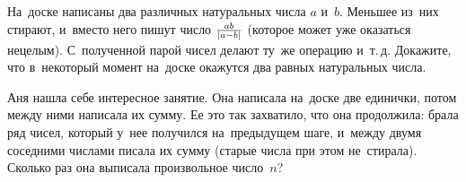 \begin{problems}
\item
На~доске написаны два различных натуральных числа $a$ и~$b$.
Меньшее из~них стирают, и~вместо него пишут число $\frac{ab}{\lvert a - b \rvert}$
(которое может уже оказаться нецелым).
С~полученной парой чисел делают ту~же операцию и~т.\,д.
Докажите, что в~некоторый момент на~доске окажутся два равных натуральных
числа.

\item
Аня нашла себе интересное занятие.
Она написала на~доске две единички, потом между ними написала их сумму.
Ее это так захватило, что она продолжила: брала ряд чисел, который у~нее
получился на~предыдущем шаге, и~между двумя соседними числами писала их сумму
(старые числа при этом не~стирала).
Сколько раз она выписала произвольное число~$n$?

\end{problems}

\endgroup %

